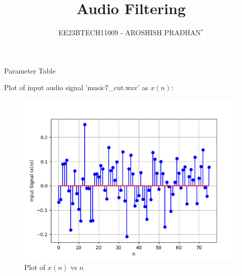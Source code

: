 \documentclass[journal,12pt,twocolumn]{IEEEtran}
\theoremstyle{remark}
\begin{document}

\vspace{3cm}

\title{Audio Filtering}
\author{EE23BTECH11009 - AROSHISH PRADHAN$^{*}$%
}
\maketitle
\newpage
\bigskip

\begin{table}[!h]
    \centering
    
    \caption{Parameter Table}
    \label{tab:parameters}
\end{table}

Plot of input audio signal 'music7\_cut.wav' as $x(n)$:
\begin{figure}[!h]
    \centering
    \includegraphics[width = \columnwidth]{figs/x_plot.png}
    \caption{Plot of $x(n)$ vs $n$}
    \label{fig:x_plot}
\end{figure}
\end{document}
